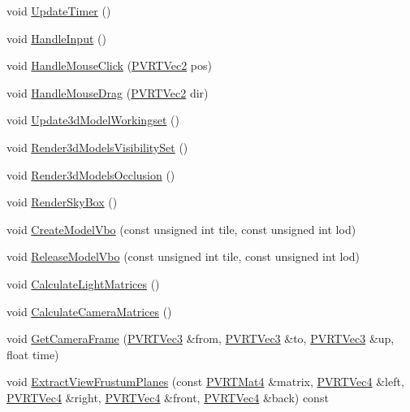 \begin{DoxyCompactItemize}
\item 
void \hyperlink{class_o_g_l_e_s3_navigation3_d_a336108dfe15adf54e2df01924cd31ef5}{Update\+Timer} ()
\item 
void \hyperlink{class_o_g_l_e_s3_navigation3_d_a520be1709c4eaf47d07ef69f237619f9}{Handle\+Input} ()
\item 
void \hyperlink{class_o_g_l_e_s3_navigation3_d_ac3d1d07b36ff1e7e6e03ad23e06dc2f3}{Handle\+Mouse\+Click} (\hyperlink{struct_p_v_r_t_vec2}{P\+V\+R\+T\+Vec2} pos)
\item 
void \hyperlink{class_o_g_l_e_s3_navigation3_d_a4a8878c606ceb18e17639a1912e18ec5}{Handle\+Mouse\+Drag} (\hyperlink{struct_p_v_r_t_vec2}{P\+V\+R\+T\+Vec2} dir)
\item 
void \hyperlink{class_o_g_l_e_s3_navigation3_d_acf18caba59cc7f109c1120f4d778184c}{Update3d\+Model\+Workingset} ()
\item 
void \hyperlink{class_o_g_l_e_s3_navigation3_d_a41b0a44693eff9264a7ffe49f324d227}{Render3d\+Models\+Visibility\+Set} ()
\item 
void \hyperlink{class_o_g_l_e_s3_navigation3_d_ab52b6a6f66d5737e7650f8f9ace92a94}{Render3d\+Models\+Occlusion} ()
\item 
void \hyperlink{class_o_g_l_e_s3_navigation3_d_af77114b46a0136e99a98f4e45b4a2253}{Render\+Sky\+Box} ()
\item 
void \hyperlink{class_o_g_l_e_s3_navigation3_d_aab331a1e883cc00e3ed851412dc80eaa}{Create\+Model\+Vbo} (const unsigned int tile, const unsigned int lod)
\item 
void \hyperlink{class_o_g_l_e_s3_navigation3_d_a40665aa8050068f96d24c1cc643b3117}{Release\+Model\+Vbo} (const unsigned int tile, const unsigned int lod)
\item 
void \hyperlink{class_o_g_l_e_s3_navigation3_d_ae076550e9de57c638a68570b20e79390}{Calculate\+Light\+Matrices} ()
\item 
void \hyperlink{class_o_g_l_e_s3_navigation3_d_aeb2ae2214c5eb66a4fa78d660489fd3f}{Calculate\+Camera\+Matrices} ()
\item 
void \hyperlink{class_o_g_l_e_s3_navigation3_d_a03399eaea0725f9a6c81735610b789c7}{Get\+Camera\+Frame} (\hyperlink{struct_p_v_r_t_vec3}{P\+V\+R\+T\+Vec3} \&from, \hyperlink{struct_p_v_r_t_vec3}{P\+V\+R\+T\+Vec3} \&to, \hyperlink{struct_p_v_r_t_vec3}{P\+V\+R\+T\+Vec3} \&up, float time)
\item 
void \hyperlink{class_o_g_l_e_s3_navigation3_d_a4dc86685e13d0539e2c4fc742726feef}{Extract\+View\+Frustum\+Planes} (const \hyperlink{struct_p_v_r_t_mat4}{P\+V\+R\+T\+Mat4} \&matrix, \hyperlink{struct_p_v_r_t_vec4}{P\+V\+R\+T\+Vec4} \&left, \hyperlink{struct_p_v_r_t_vec4}{P\+V\+R\+T\+Vec4} \&right, \hyperlink{struct_p_v_r_t_vec4}{P\+V\+R\+T\+Vec4} \&front, \hyperlink{struct_p_v_r_t_vec4}{P\+V\+R\+T\+Vec4} \&back) const 

\end{DoxyCompactItemize}
